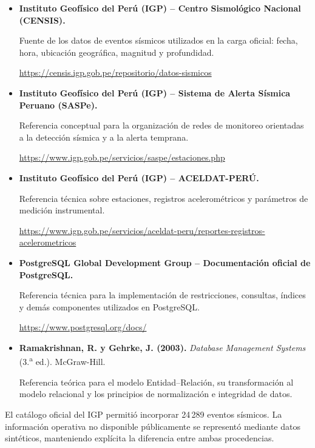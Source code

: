 \documentclass[12pt,a4paper]{article}
\begin{document}
\begin{itemize}

    \item \textbf{Instituto Geofísico del Perú (IGP) -- Centro Sismológico Nacional (CENSIS).}

    Fuente de los datos de eventos sísmicos utilizados en la carga oficial: fecha, hora, ubicación geográfica, magnitud y profundidad.

    \url{https://censis.igp.gob.pe/repositorio/datos-sismicos}

    \item \textbf{Instituto Geofísico del Perú (IGP) -- Sistema de Alerta Sísmica Peruano (SASPe).}

    Referencia conceptual para la organización de redes de monitoreo orientadas a la detección sísmica y a la alerta temprana.

    \url{https://www.igp.gob.pe/servicios/saspe/estaciones.php}

    \item \textbf{Instituto Geofísico del Perú (IGP) -- ACELDAT-PERÚ.}

    Referencia técnica sobre estaciones, registros acelerométricos y parámetros de medición instrumental.

    \url{https://www.igp.gob.pe/servicios/aceldat-peru/reportes-registros-acelerometricos}

    \item \textbf{PostgreSQL Global Development Group -- Documentación oficial de PostgreSQL.}

    Referencia técnica para la implementación de restricciones, consultas, índices y demás componentes utilizados en PostgreSQL.

    \url{https://www.postgresql.org/docs/}

    \item \textbf{Ramakrishnan, R. y Gehrke, J. (2003).}
    \textit{Database Management Systems} (3.\textsuperscript{a} ed.). McGraw-Hill.

    Referencia teórica para el modelo Entidad--Relación, su transformación al modelo relacional y los principios de normalización e integridad de datos.

\end{itemize}

El catálogo oficial del IGP permitió incorporar 24\,289 eventos sísmicos. La información operativa no disponible públicamente se representó mediante datos sintéticos, manteniendo explícita la diferencia entre ambas procedencias.
\end{document}
